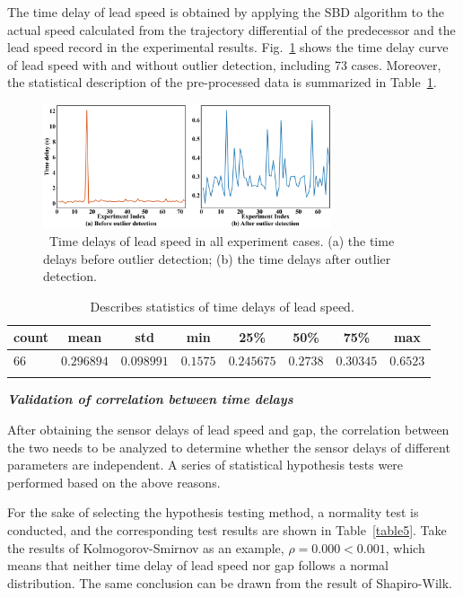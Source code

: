\documentclass[journal]{IEEEtran}
\begin{document}
The time delay of lead speed is obtained by applying the SBD algorithm to the actual speed calculated from the trajectory differential of the predecessor and the lead speed record in the experimental results. Fig.~\ref{fig5} shows the time delay curve of lead speed with and without outlier detection, including 73 cases. Moreover, the statistical description of the pre-processed data is summarized in Table~\ref{table4}.



\begin{figure}
  \centering
  \includegraphics[width=8.5cm]{figs/fig5.png}
  \caption{~Time delays of lead speed in all experiment cases. (a) the time delays before outlier detection; (b) the time delays after outlier detection.}
  \label{fig5}
\end{figure}

\begin{table}
  \centering
  \setlength{\abovecaptionskip}{0pt}
  \setlength{\belowcaptionskip}{10pt}%
  \caption{~Describes statistics of time delays of lead speed.}
  {\begin{tabular}{lccccccc} \toprule
      count & mean       & std        & min      & 25\%       & 50\%     & 75\%      & max      \\ \midrule
      $66$  & $0.296894$ & $0.098991$ & $0.1575$ & $0.245675$ & $0.2738$ & $0.30345$ & $0.6523$ \\
      \bottomrule
      \label{table4}
    \end{tabular}}
\end{table}


\textbf{\emph{Validation of correlation between time delays}}

After obtaining the sensor delays of lead speed and gap, the correlation between the two needs to be analyzed to determine whether the sensor delays of different parameters are independent. A series of statistical hypothesis tests were performed based on the above reasons.

For the sake of selecting the hypothesis testing method, a normality test is conducted, and the corresponding test results are shown in Table~\ref{table5}. Take the results of Kolmogorov-Smirnov as an example, $\rho= 0.000<0.001$, which means that neither time delay of lead speed nor gap follows a normal distribution. The same conclusion can be drawn from the result of Shapiro-Wilk.
\end{document}
